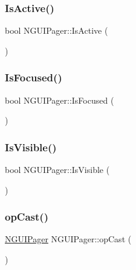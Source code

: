 \subsubsection{\texorpdfstring{Is\+Active()}{IsActive()}}
{\footnotesize\ttfamily bool N\+G\+U\+I\+Pager\+::\+Is\+Active (\begin{DoxyParamCaption}{ }\end{DoxyParamCaption})}

\hypertarget{class_n_g_u_i_pager_ab1090dd9d358a4b31b27b4dc3c8f0c97}{}\label{class_n_g_u_i_pager_ab1090dd9d358a4b31b27b4dc3c8f0c97} 
\subsubsection{\texorpdfstring{Is\+Focused()}{IsFocused()}}
{\footnotesize\ttfamily bool N\+G\+U\+I\+Pager\+::\+Is\+Focused (\begin{DoxyParamCaption}{ }\end{DoxyParamCaption})}

\hypertarget{class_n_g_u_i_pager_a38d632857c51250b720ce5f171191aa4}{}\label{class_n_g_u_i_pager_a38d632857c51250b720ce5f171191aa4} 
\subsubsection{\texorpdfstring{Is\+Visible()}{IsVisible()}}
{\footnotesize\ttfamily bool N\+G\+U\+I\+Pager\+::\+Is\+Visible (\begin{DoxyParamCaption}{ }\end{DoxyParamCaption})}

\hypertarget{class_n_g_u_i_pager_a3e2a9ea2f57516414e8f1c2da5017c37}{}\label{class_n_g_u_i_pager_a3e2a9ea2f57516414e8f1c2da5017c37} 
\subsubsection{\texorpdfstring{op\+Cast()}{opCast()}}
{\footnotesize\ttfamily \hyperlink{class_n_g_u_i_pager}{N\+G\+U\+I\+Pager} N\+G\+U\+I\+Pager\+::op\+Cast (\begin{DoxyParamCaption}{ }\end{DoxyParamCaption})}

